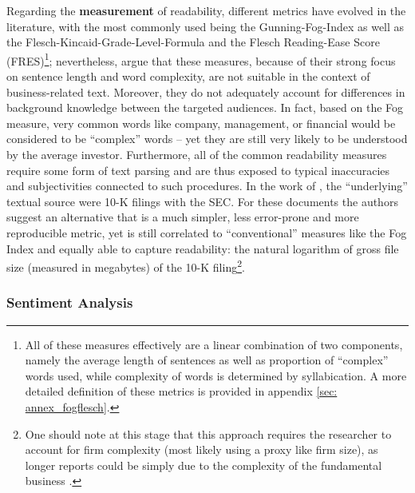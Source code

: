 Regarding the \textbf{measurement} of readability, different metrics have evolved in the literature, with the most commonly used being the Gunning-Fog-Index as well as the Flesch-Kincaid-Grade-Level-Formula and the Flesch Reading-Ease Score (FRES)\footnote{All of these measures effectively are a linear combination of two components, namely the average length of sentences as well as proportion of \enquote{complex} words used, while complexity of words is determined by syllabication. A more detailed definition of these metrics is provided in appendix \ref{sec: annex_fogflesch}.}; nevertheless, \textcite[1649]{Loughran2014} argue that these measures, because of their strong focus on sentence length and word complexity, are not suitable in the context of business-related text. Moreover, they do not adequately account for differences in background knowledge between the targeted audiences. In fact, based on the Fog measure, very common words like \textsf{company}, \textsf{management}, or \textsf{financial} would be considered to be \enquote{complex} words -- yet they are still very likely to be understood by the average investor. Furthermore, all of the common readability measures require some form of text parsing and are thus exposed to typical inaccuracies and subjectivities connected to such procedures. In the work of \textcite{Loughran2014}, the \enquote{underlying} textual source were 10-K filings with the SEC. For these documents the authors suggest an alternative that is a much simpler, less error-prone and more reproducible metric, yet is still correlated to \enquote{conventional} measures like the Fog Index and equally able to capture readability: the natural logarithm of gross file size (measured in megabytes) of the 10-K filing\footnote{One should note at this stage that this approach requires the researcher to account for firm complexity (most likely using a proxy like firm size), as longer reports could be simply due to the complexity of the fundamental business \parencite{LM-meta-2016}. }.


\subsubsection{Sentiment Analysis}
\label{sssec: lit_rev_mining_senti}

